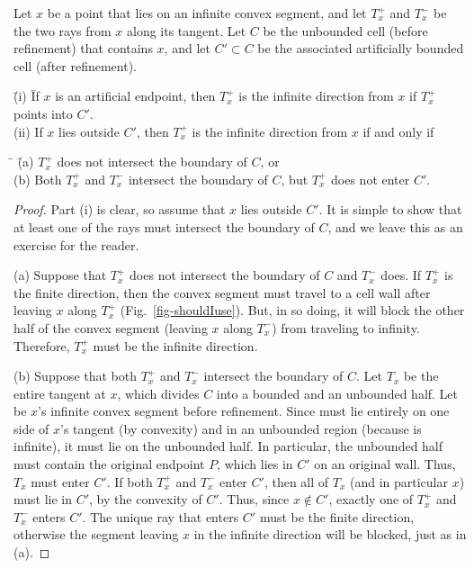 \begin{lemma}
\label{lem-ty}
Let $x$ be a point that lies on an infinite convex segment,
and let $T_{x}^{+}$ and $T_{x}^{-}$ be the two rays from $x$ along 
its tangent.
Let $C$ be the unbounded cell {\rm (}before refinement{\rm )} that 
contains $x$, and 
let $C' \subset C$ be the associated artificially bounded cell 
{\rm (}after refinement{\rm )}.
%
\begin{tabbing}
\indent \= {\rm (i)} \= If $x$ is an artificial endpoint,
then $T_{x}^{+}$ is the infinite direction from $x$ if 
$T_{x}^{+}$ \\
\> \> points into $C'$.\\
\> {\rm (ii)} If $x$ lies outside $C'$, then 
$T_{x}^{+}$ is the infinite direction from $x$ if and only if
\end{tabbing}
\begin{tabbing}
\indent \= \hspace{.15in} \= {\rm (a)} $T_{x}^{+}$ does not 
intersect the boundary of $C$, or\\
\> \> {\rm (b)} Both $T_{x}^{+}$ and $T_{x}^{-}$ intersect the boundary 
	of $C$, 
	but $T_{x}^{+}$ does not enter $C'$.
\end{tabbing}
\end{lemma}
\begin{proof}
Part (i) is clear, so assume that $x$ lies outside $C'$.
It is simple to show that at least one of the rays must intersect the 
boundary
of $C$, and we leave this as an exercise for the reader.

(a) Suppose that $T_{x}^{+}$ does not intersect the boundary of $C$ 
and $T_{x}^{-}$ does.
If $T_{x}^{+}$ is the finite direction,
then the convex segment must travel to a cell wall after leaving $x$ 
along $T_{x}^{+}$
(Fig.~\ref{fig-shouldIuse}).
But, in so doing, it will block the other half of the convex segment 
(leaving $x$ along $T_{x}^{-}$) from traveling to infinity.
Therefore, $T_{x}^{+}$ must be the infinite direction.

(b) Suppose that both $T_{x}^{+}$ and $T_{x}^{-}$ intersect the boundary
of $C$.
Let $T_{x}$ be the entire tangent at $x$, which 
divides $C$ into a bounded and an unbounded half.
Let  be $x$'s infinite convex segment before refinement.
Since  must lie entirely on one side of $x$'s tangent 
(by convexity)
and in an unbounded region (because  is infinite), it must lie
on the unbounded half.
In particular, the unbounded half must contain the original endpoint $P$, 
which
lies in $C'$ on an original wall.
Thus, $T_{x}$ must enter $C'$.
If both $T_{x}^{+}$ and $T_{x}^{-}$ enter $C'$, then 
all of $T_{x}$ (and in particular $x$) must lie in $C'$, by the
convexity of $C'$.
Thus, since $x \not\in C'$, exactly one of $T_{x}^{+}$ and $T_{x}^{-}$
enters $C'$.
The unique ray that enters $C'$ must be the finite direction, otherwise 
the segment leaving $x$ in the infinite direction will be blocked, just 
as in (a).
\end{proof}

